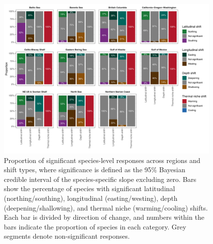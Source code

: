 \documentclass[11pt]{article}
\begin{document}
\begin{figure}[h]
    \centering
    \includegraphics[scale=.65]{output/figures/prop_sign.png}
    \caption{Proportion of significant species-level responses across regions and shift types, where significance is defined as the 95\% Bayesian credible interval of the species-specific slope excluding zero. 
Bars show the percentage of species with significant latitudinal (northing/southing), longitudinal (easting/westing), depth (deepening/shallowing), and thermal niche (warming/cooling) shifts. 
Each bar is divided by direction of change, and numbers within the bars indicate the proportion of species in each category. 
Grey segments denote non-significant responses.}
    \label{fig:prop_sign}
\end{figure}


\newpage
\end{document}
